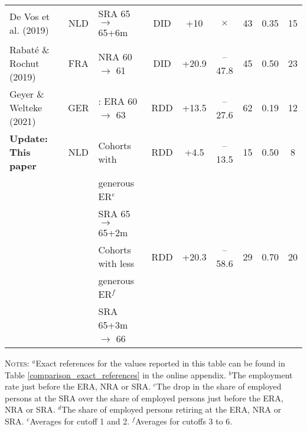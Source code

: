 \documentclass[12pt,a4paper]{article}
\begin{document}
\begin{table}[!t]
\begin{adjustwidth}{-0.75in}{-0.5in}
\begin{tabular}{lclc cc ccc}
			De Vos et al. (2019) & NLD & SRA 65 $\rightarrow$ 65+6m & 
			DID & 
			+10 & $\times$ &  
			43 & 0.35 & 15 \\

			Rabaté \& Rochut (2019) & FRA & NRA 60 $\rightarrow$ 61 &
			DID & 
			+20.9 & --47.8 &  
			45 & 0.50 & 23 \\

			Geyer \& Welteke (2021) &
			GER & \female: ERA 60 $\rightarrow$ 63 &  
			RDD  &
			+13.5 & --27.6 &
			62 & 0.19 & 12 \\ 

			\textbf{Update: This paper} &
			NLD & Cohorts with & RDD  & +4.5 & --13.5 & 15 & 0.50 & 8 \\
               & & generous ER$^e$ & \\                      & &  SRA 65 $\rightarrow$ 65+2m & \\  
			&  & Cohorts with less  &  	RDD  & +20.3 & --58.6 & 29 & 0.70 & 20 \\
			& & generous ER$^f$ \\
                                     & & SRA 65+3m $\rightarrow$ 66 \\
			\bottomrule
		\end{tabular}
\begin{minipage}{17cm}%
	\textsc{Notes:} $^a$Exact references for the values reported in this table can be found in Table \ref{comparison_exact_references} in the online appendix. $^b$The employment rate just before the ERA, NRA or SRA. $^c$The drop in the share of employed persons at the SRA over the share of employed persons just before the ERA, NRA or SRA. $^d$The share of employed persons retiring at the ERA, NRA or SRA. $^e$Averages for cutoff 1 and 2. $^f$Averages for cutoffs 3 to 6.
\end{minipage}%
\vspace{-.5cm}
\end{adjustwidth}
\end{table}
\end{document}
